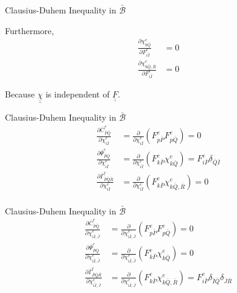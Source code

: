 \documentclass[11pt]{beamer}
\newcommand{\TEN}[1]{\underline{\underline{#1}}}
\begin{document}
\begin{frame}{Clausius-Duhem Inequality in $\bar{\mathcal{B}}$}

Furthermore,
\begin{align*}
\frac{\partial \chi_{k\bar{Q}}^e}{\partial F_{i\bar{I}}^e} &= 0\\
\frac{\partial \chi_{k\bar{Q},\bar{R}}^e}{\partial F_{i\bar{I}}^e} &= 0
\end{align*}

Because $\TEN{\chi}$ is independent of $\TEN{F}$.

\end{frame}

\begin{frame}{Clausius-Duhem Inequality in $\bar{\mathcal{B}}$}
\begin{align*}
\frac{\partial \bar{C}_{\bar{P}\bar{Q}}^e}{\partial \chi_{i\bar{I}}^e} &= \frac{\partial}{\partial \chi_{i\bar{I}}^e}\left(F_{p\bar{P}}^e F_{p\bar{Q}}^e\right) = 0\\
\frac{\partial \bar{\Psi}_{\bar{P}\bar{Q}}^e}{\partial \chi_{i\bar{I}}^e} &= \frac{\partial}{\partial \chi_{i\bar{I}}^e}\left( F_{k\bar{P}}^e \chi_{k\bar{Q}}^e\right) = F_{i\bar{P}}^e \delta_{\bar{Q}\bar{I}}\\
\frac{\partial \bar{\Gamma}_{\bar{P}\bar{Q}\bar{R}}^e}{\partial \chi_{i\bar{I}}^e} &= \frac{\partial}{\partial \chi_{i\bar{I}}^e}\left(F_{k\bar{P}}^e \chi_{k\bar{Q},\bar{R}}^e\right) = 0\\
\end{align*}
\end{frame}

\begin{frame}{Clausius-Duhem Inequality in $\bar{\mathcal{B}}$}
\begin{align*}
\frac{\partial \bar{C}_{\bar{P}\bar{Q}}^e}{\partial \chi_{i\bar{I},\bar{J}}^e} &= \frac{\partial}{\partial \chi_{i\bar{I},\bar{J}}^e}\left(F_{p\bar{P}}^e F_{p\bar{Q}}^e\right) = 0\\
\frac{\partial \bar{\Psi}_{\bar{P}\bar{Q}}^e}{\partial \chi_{i\bar{I},\bar{J}}^e} &= \frac{\partial}{\partial \chi_{i\bar{I},\bar{J}}^e}\left( F_{k\bar{P}}^e \chi_{k\bar{Q}}^e\right) = 0\\
\frac{\partial \bar{\Gamma}_{\bar{P}\bar{Q}\bar{R}}^e}{\partial \chi_{i\bar{I},\bar{J}}^e} &= \frac{\partial}{\partial \chi_{i\bar{I},\bar{J}}^e}\left(F_{k\bar{P}}^e \chi_{k\bar{Q},\bar{R}}^e\right) = F_{i\bar{P}}^e \delta_{\bar{I}\bar{Q}} \delta_{\bar{J}\bar{R}}\\
\end{align*}
\end{frame}
\end{document}

